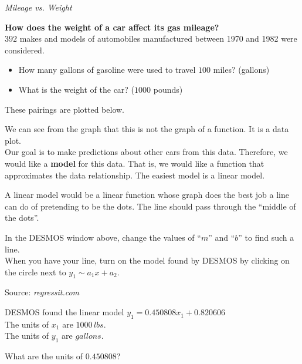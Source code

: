 \documentclass{ximera}
\begin{document}
\begin{model} \textit{Mileage vs. Weight}

\textbf{How does the weight of a car affect its gas mileage?} \\



$392$ makes and models of automobiles manufactured between 1970 and 1982 were considered.  

\begin{itemize}
\item How many gallons of gasoline were used to travel $100$ miles?   (gallons)
\item What is the weight of the car?    ($1000$ pounds)
\end{itemize}


These pairings are plotted below.




\begin{center}
\end{center}


We can see from the graph that this is not the graph of a function.  It is a data plot.\\


Our goal is to make predictions about other cars from this data.  Therefore, we would like a \textbf{model} for this data.  That is, we would like a function that approximates the data relationship.  The easiest model is a linear model.


A linear model would be a linear function whose graph does the best job a line can do of pretending to be the dots.  The line should pass through the ``middle of the dots''.

In the DESMOS window above, change the values of ``$m$'' and ``$b$'' to find such a line. \\

When you have your line, turn on the model found by DESMOS by clicking on the circle next to $y_1 \sim a_1 x + a_2$.


Source:   \textit{regressit.com}
\end{model}



\begin{question}


DESMOS found the linear model $y_1 = 0.450808 x_1 + 0.820606$ \\


The units of $x_1$ are $1000 \, lbs$. \\
The units of $y_1$ are $gallons$.



What are the units of $0.450808$?

\begin{multipleChoice}
\end{multipleChoice}


\end{question}
\end{document}
